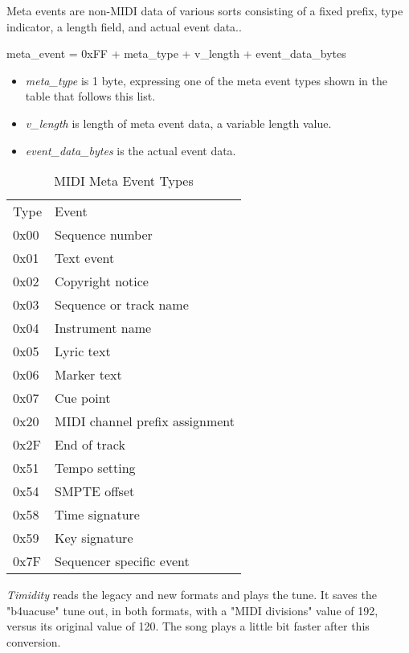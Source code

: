    Meta events are non-MIDI data of various sorts consisting of a fixed prefix,
   type indicator, a length field, and actual event data..
 
   meta\_event = 0xFF + meta\_type + v\_length + event\_data\_bytes

   \begin{itemize}
      \item \textsl{meta\_type} is 1 byte, expressing one of the meta event
         types shown in the table that follows this list.
      \item \textsl{v\_length} is length of meta event data, a variable
         length value.
      \item \textsl{event\_data\_bytes} is the actual event data.
   \end{itemize}

   \begin{table}
      \caption{MIDI Meta Event Types}
      \label{table:midi_meta_event_types}
      \begin{tabular}{l l}
         Type	& Event \\
         0x00	& Sequence number \\
         0x01	& Text event \\
         0x02	& Copyright notice \\
         0x03	& Sequence or track name \\
         0x04	& Instrument name \\
         0x05	& Lyric text \\
         0x06	& Marker text \\
         0x07	& Cue point \\
         0x20	& MIDI channel prefix assignment \\
         0x2F	& End of track \\
         0x51	& Tempo setting \\
         0x54	& SMPTE offset \\
         0x58	& Time signature \\
         0x59	& Key signature \\
         0x7F	& Sequencer specific event \\
      \end{tabular}
   \end{table}

   \textsl{Timidity} reads the legacy and new formats and plays the tune.
   It saves the "b4uacuse" tune out, in both formats, with a "MIDI
   divisions" value of 192, versus its original value of 120.  The song
   plays a little bit faster after this conversion.

